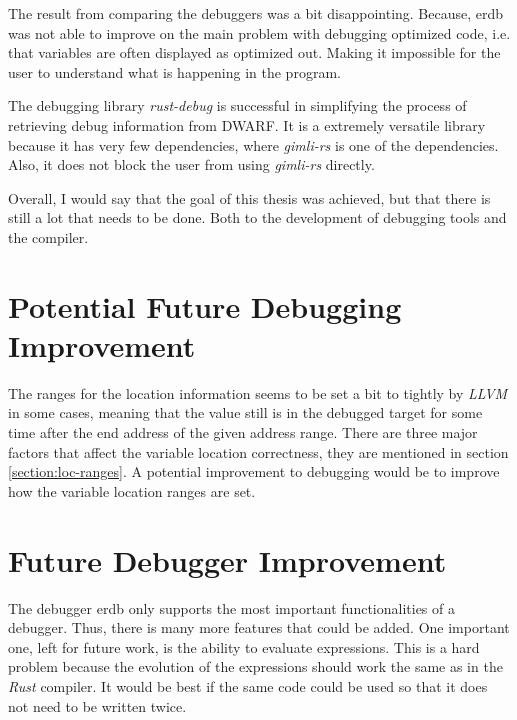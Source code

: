 

The result from comparing the debuggers was a bit disappointing.
Because, \gls{erdb} was not able to improve on the main problem with debugging optimized code, i.e. that variables are often displayed as optimized out.
Making it impossible for the user to understand what is happening in the program.


The debugging library \emph{rust-debug} is successful in simplifying the process of retrieving debug information from \gls{DWARF}.
It is a extremely versatile library because it has very few dependencies, where \emph{gimli-rs} is one of the dependencies.
Also, it does not block the user from using \emph{gimli-rs} directly.


Overall, I would say that the goal of this thesis was achieved, but that there is still a lot that needs to be done.
Both to the development of debugging tools and the compiler.


\section{Potential Future Debugging Improvement}
The ranges for the location information seems to be set a bit to tightly by \emph{LLVM} in some cases, meaning that the value still is in the debugged target for some time after the end address of the given address range.
There are three major factors that affect the variable location correctness, they are mentioned in section \ref{section:loc-ranges}.
A potential improvement to debugging would be to improve how the variable location ranges are set.


\section{Future Debugger Improvement}
The debugger \gls{erdb} only supports the most important functionalities of a debugger.
Thus, there is many more features that could be added.
One important one, left for future work, is the ability to evaluate expressions.
This is a hard problem because the evolution of the expressions should work the same as in the \emph{Rust} compiler.
It would be best if the same code could be used so that it does not need to be written twice.


